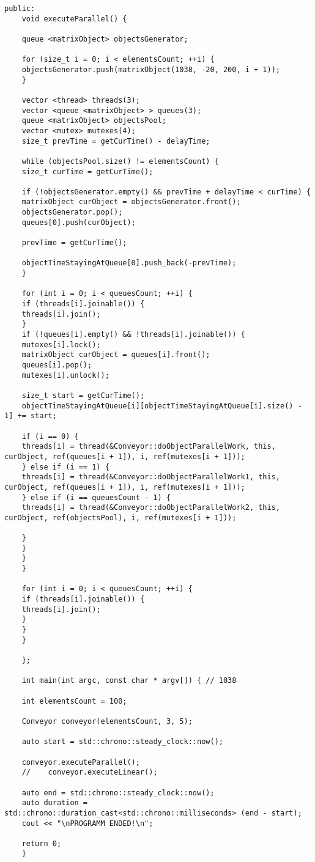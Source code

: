 \documentclass[12pt, a4paper]{report}
\begin{document}
\begin{lstlisting}[label=code:conveyor,caption=Реализация линейной и конвейерной обработки матрицы]
	public:
	void executeParallel() {
	
	queue <matrixObject> objectsGenerator;
	
	for (size_t i = 0; i < elementsCount; ++i) {
	objectsGenerator.push(matrixObject(1038, -20, 200, i + 1));
	}
	
	vector <thread> threads(3);
	vector <queue <matrixObject> > queues(3);
	queue <matrixObject> objectsPool;
	vector <mutex> mutexes(4);
	size_t prevTime = getCurTime() - delayTime;
	
	while (objectsPool.size() != elementsCount) {
	size_t curTime = getCurTime();
	
	if (!objectsGenerator.empty() && prevTime + delayTime < curTime) {
	matrixObject curObject = objectsGenerator.front();
	objectsGenerator.pop();
	queues[0].push(curObject);
	
	prevTime = getCurTime();
	
	objectTimeStayingAtQueue[0].push_back(-prevTime);
	}
	
	for (int i = 0; i < queuesCount; ++i) {
	if (threads[i].joinable()) {
	threads[i].join();
	}
	if (!queues[i].empty() && !threads[i].joinable()) {
	mutexes[i].lock();
	matrixObject curObject = queues[i].front();
	queues[i].pop();
	mutexes[i].unlock();
	
	size_t start = getCurTime();
	objectTimeStayingAtQueue[i][objectTimeStayingAtQueue[i].size() - 1] += start;
	
	if (i == 0) {
	threads[i] = thread(&Conveyor::doObjectParallelWork, this, curObject, ref(queues[i + 1]), i, ref(mutexes[i + 1]));
	} else if (i == 1) {
	threads[i] = thread(&Conveyor::doObjectParallelWork1, this, curObject, ref(queues[i + 1]), i, ref(mutexes[i + 1]));
	} else if (i == queuesCount - 1) {
	threads[i] = thread(&Conveyor::doObjectParallelWork2, this, curObject, ref(objectsPool), i, ref(mutexes[i + 1]));
	
	}
	}
	}
	}
	
	for (int i = 0; i < queuesCount; ++i) {
	if (threads[i].joinable()) {
	threads[i].join();
	}
	}
	}
	
	};
	
	int main(int argc, const char * argv[]) { // 1038
	
	int elementsCount = 100;
	
	Conveyor conveyor(elementsCount, 3, 5);
	
	auto start = std::chrono::steady_clock::now();
	
	conveyor.executeParallel();
	//    conveyor.executeLinear();
	
	auto end = std::chrono::steady_clock::now();
	auto duration = std::chrono::duration_cast<std::chrono::milliseconds> (end - start);
	cout << "\nPROGRAMM ENDED!\n";
	
	return 0;
	}
	\end{lstlisting}
	
\end{document}
